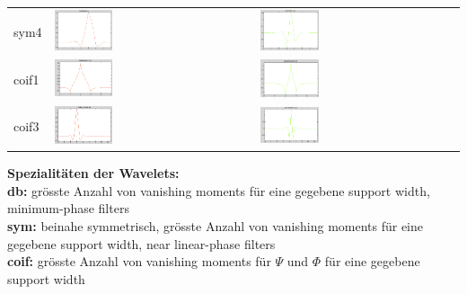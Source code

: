 \begin{center}
\begin{tabular}{l||m{}|m{}}
		sym4 & 
		\includegraphics[width=0.3\textwidth]{content/Sym4Phi.png} &
		\includegraphics[width=0.3\textwidth]{content/Sym4Psi.png} \\
		coif1 &
		\includegraphics[width=0.3\textwidth]{content/Coif1Phi.png} &
		\includegraphics[width=0.3\textwidth]{content/Coif1Psi.png} \\
		coif3 &
		\includegraphics[width=0.3\textwidth]{content/Coif3Phi.png} &
		\includegraphics[width=0.3\textwidth]{content/Coif3Psi.png} \\
	\end{tabular}
\end{center}

\textbf{Spezialitäten der Wavelets:}\\
\textbf{db:} grösste Anzahl von vanishing moments für eine gegebene support width, minimum-phase filters\\
\textbf{sym:} beinahe symmetrisch, grösste Anzahl von vanishing moments für eine gegebene support width, near linear-phase filters\\ 
\textbf{coif:} grösste Anzahl von vanishing moments für $\Psi$ und $\Phi$ für eine gegebene support width\\

